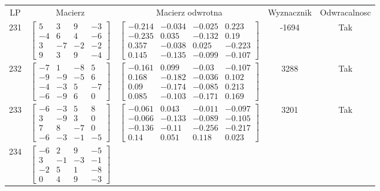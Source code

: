\documentclass[a4paper,12pt]{article}
\begin{document}
\bgroup {} \vspace{0.2in} \begin{tabular}{c c c c c}
LP & Macierz & Macierz odwrotna & Wyznacznik & Odwracalnosc\\
231
&
$\begin{bmatrix} 5 & 3 & 9 & -3 \\ -4 & 6 & 4 & -6 \\ 3 & -7 & -2 & -2 \\ 9 & 3 & 9 & -4 \end{bmatrix}$
&
$\begin{bmatrix} -0.214 & -0.034 & -0.025 & 0.223 \\ -0.235 & 0.035 & -0.132 & 0.19 \\ 0.357 & -0.038 & 0.025 & -0.223 \\ 0.145 & -0.135 & -0.099 & -0.107 \end{bmatrix}$
&
-1694
&
Tak
\\
232
&
$\begin{bmatrix} -7 & 1 & -8 & 5 \\ -9 & -9 & -5 & 6 \\ -4 & -3 & 5 & -7 \\ -6 & -9 & 6 & 0 \end{bmatrix}$
&
$\begin{bmatrix} -0.161 & 0.099 & -0.03 & -0.107 \\ 0.168 & -0.182 & -0.036 & 0.102 \\ 0.09 & -0.174 & -0.085 & 0.213 \\ 0.085 & -0.103 & -0.171 & 0.169 \end{bmatrix}$
&
3288
&
Tak
\\
233
&
$\begin{bmatrix} -6 & -3 & 5 & 8 \\ 3 & -9 & 3 & 0 \\ 7 & 8 & -7 & 0 \\ -6 & -3 & -1 & -5 \end{bmatrix}$
&
$\begin{bmatrix} -0.061 & 0.043 & -0.011 & -0.097 \\ -0.066 & -0.133 & -0.089 & -0.105 \\ -0.136 & -0.11 & -0.256 & -0.217 \\ 0.14 & 0.051 & 0.118 & 0.023 \end{bmatrix}$
&
3201
&
Tak
\\
234
&
$\begin{bmatrix} -6 & 2 & 9 & -5 \\ 3 & -1 & -3 & -1 \\ -2 & 5 & 1 & -8 \\ 0 & 4 & 9 & -3 \end{bmatrix}$

\end{tabular}
\end{document}
